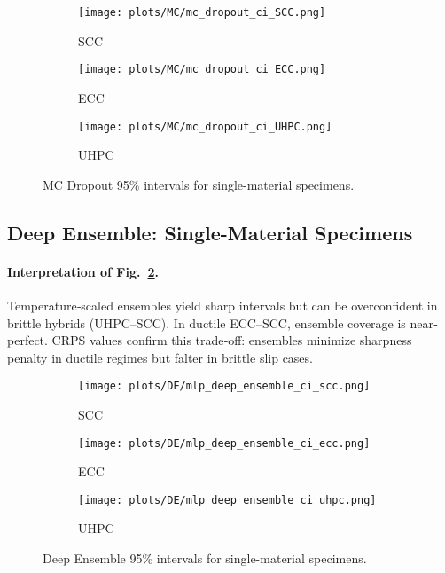 \documentclass{article}
\begin{document}
\label{app:mcdo_single}
\begin{figure}[H]
\centering
\begin{subfigure}[t]{0.32\linewidth}
    \centering
    \texttt{[image: plots/MC/mc\_dropout\_ci\_SCC.png]}
    \caption{SCC}
\end{subfigure}\hfill
\begin{subfigure}[t]{0.32\linewidth}
    \centering
    \texttt{[image: plots/MC/mc\_dropout\_ci\_ECC.png]}
    \caption{ECC}
\end{subfigure}\hfill
\begin{subfigure}[t]{0.32\linewidth}
    \centering
    \texttt{[image: plots/MC/mc\_dropout\_ci\_UHPC.png]}
    \caption{UHPC}
\end{subfigure}
\caption{MC Dropout 95\% intervals for single-material specimens.}
\label{fig:mcdo_singles}
\end{figure}

\subsection{Deep Ensemble: Single-Material Specimens}

\paragraph{Interpretation of Fig.~\ref{fig:ens_singles}.}
Temperature‐scaled ensembles yield sharp intervals but can be overconfident in brittle hybrids (UHPC–SCC). In ductile ECC–SCC, ensemble coverage is near‐perfect. CRPS values confirm this trade‐off: ensembles minimize sharpness penalty in ductile regimes but falter in brittle slip cases.

\label{app:ens_single}
\begin{figure}[H]
\centering
\begin{subfigure}[t]{0.32\linewidth}
    \centering
    \texttt{[image: plots/DE/mlp\_deep\_ensemble\_ci\_scc.png]}
    \caption{SCC}
\end{subfigure}\hfill
\begin{subfigure}[t]{0.32\linewidth}
    \centering
    \texttt{[image: plots/DE/mlp\_deep\_ensemble\_ci\_ecc.png]}
    \caption{ECC}
\end{subfigure}\hfill
\begin{subfigure}[t]{0.32\linewidth}
    \centering
    \texttt{[image: plots/DE/mlp\_deep\_ensemble\_ci\_uhpc.png]}
    \caption{UHPC}
\end{subfigure}
\caption{Deep Ensemble 95\% intervals for single-material specimens.}
\label{fig:ens_singles}
\end{figure}
\end{document}
